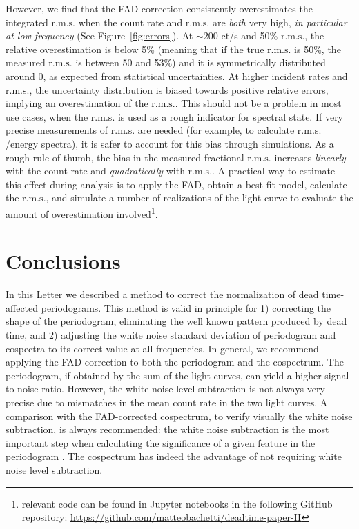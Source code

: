 \documentclass[twocolumn]{aastex61}
\newcommand{\rms}{\ensuremath{\mathrm{r.m.s.}}\xspace}
\begin{document}
However, we find that the FAD correction consistently overestimates the integrated \rms when the count rate and \rms are \textit{both} very high, \textit{in particular at low frequency} (See Figure~\ref{fig:errors}).
At $\sim$200 ct/s and 50\% \rms, the relative overestimation is below 5\% (meaning that if the true \rms is 50\%, the measured \rms is between 50 and 53\%) and it is symmetrically distributed around 0, as expected from statistical uncertainties. 
At higher incident rates and \rms, the uncertainty distribution is biased towards positive relative errors, implying an overestimation of the \rms. 
This should not be a problem in most use cases, when the \rms is used as a rough indicator for spectral state.
If very precise measurements of \rms are needed (for example, to calculate \rms/energy spectra), it is safer to account for this bias through simulations.
As a rough rule-of-thumb, the bias in the measured fractional \rms increases \textit{linearly} with the count rate and \textit{quadratically} with \rms.
A practical way to estimate this effect during analysis is to apply the FAD, obtain a best fit model, calculate the \rms, and simulate a number of realizations of the light curve to evaluate the amount of overestimation involved\footnote{relevant code can be found in Jupyter notebooks in the following GitHub repository: \href{https://github.com/matteobachetti/deadtime-paper-II}{https://github.com/matteobachetti/deadtime-paper-II}}.


\section{Conclusions}
In this Letter we described a method to correct the normalization of dead time-affected periodograms.
This method is valid in principle for 
1) correcting the shape of the periodogram, eliminating the well known pattern produced by dead time, and 
2) adjusting the white noise standard deviation of periodogram and cospectra to its correct value at all frequencies.
In general, we recommend applying the FAD correction to both the periodogram and the cospectrum. 
The periodogram, if obtained by the sum of the light curves, can yield a higher signal-to-noise ratio.
However, the white noise level subtraction is not always very precise due to mismatches in the mean count rate in the two light curves. 
A comparison with the FAD-corrected cospectrum, to verify visually the white noise subtraction, is always recommended: the white noise subtraction is the most important step when calculating the significance of a given feature in the periodogram \citep[e.g.][]{Barret+12,Huppenkothen+17}.
The cospectrum has indeed the advantage of not requiring white noise level subtraction.
\end{document}
